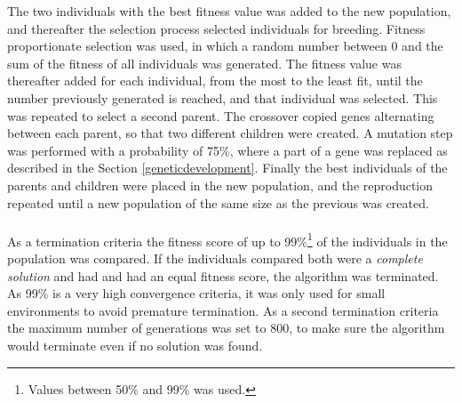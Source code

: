 The two individuals with the best fitness value was added to the new population, and thereafter the selection process selected individuals for breeding. Fitness proportionate selection was used, in which a random number between 0 and the sum of the fitness of all individuals was generated. The fitness value was thereafter added for each individual, from the most to the least fit, until the number previously generated is reached, and that individual was selected. This was repeated to select a second parent. The crossover copied genes alternating between each parent, so that two different children were created. A mutation step was performed with a probability of 75\%, where a part of a gene was replaced as described in the Section \ref{geneticdevelopment}. Finally the best individuals of the parents and children were  placed in the new population, and the reproduction repeated until a new population of the same size as the previous was created.\\\\
As a termination criteria the fitness score of up to 99\%\footnote{Values between 50\% and 99\% was used.} of the individuals in the population was compared. If the individuals compared both were a \emph{complete solution} and had and had an equal fitness score, the algorithm was terminated. As 99\% is a very high convergence criteria, it was only used for small environments to avoid premature termination. As a second termination criteria the maximum number of generations was set to 800, to make sure the algorithm would terminate even if no solution was found.
